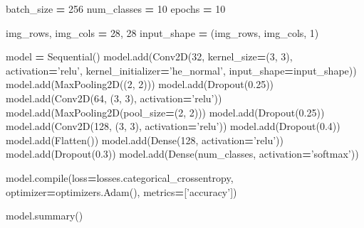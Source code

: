\documentclass[]{book}
\newenvironment{Shaded}{\begin{snugshade}}{\end{snugshade}}
\newcommand{\DecValTok}[1]{\textcolor[rgb]{0.00,0.00,0.81}{#1}}
\newcommand{\FloatTok}[1]{\textcolor[rgb]{0.00,0.00,0.81}{#1}}
\newcommand{\StringTok}[1]{\textcolor[rgb]{0.31,0.60,0.02}{#1}}
\newcommand{\OperatorTok}[1]{\textcolor[rgb]{0.81,0.36,0.00}{\textbf{#1}}}
\newcommand{\BuiltInTok}[1]{#1}
\newcommand{\NormalTok}[1]{#1}
\theoremstyle{definition}
\theoremstyle{definition}
\theoremstyle{definition}
\theoremstyle{remark}
\begin{document}
\begin{Shaded}
\begin{Highlighting}[]
\NormalTok{batch_size }\OperatorTok{=} \DecValTok{256}
\NormalTok{num_classes }\OperatorTok{=} \DecValTok{10}
\NormalTok{epochs }\OperatorTok{=} \DecValTok{10}

\NormalTok{img_rows, img_cols }\OperatorTok{=} \DecValTok{28}\NormalTok{, }\DecValTok{28}
\NormalTok{input_shape }\OperatorTok{=}\NormalTok{ (img_rows, img_cols, }\DecValTok{1}\NormalTok{)}

\NormalTok{model }\OperatorTok{=}\NormalTok{ Sequential()}
\NormalTok{model.add(Conv2D(}\DecValTok{32}\NormalTok{, kernel_size}\OperatorTok{=}\NormalTok{(}\DecValTok{3}\NormalTok{, }\DecValTok{3}\NormalTok{),}
\NormalTok{                 activation}\OperatorTok{=}\StringTok{'relu'}\NormalTok{,}
\NormalTok{                 kernel_initializer}\OperatorTok{=}\StringTok{'he_normal'}\NormalTok{,}
\NormalTok{                 input_shape}\OperatorTok{=}\NormalTok{input_shape))}
\NormalTok{model.add(MaxPooling2D((}\DecValTok{2}\NormalTok{, }\DecValTok{2}\NormalTok{)))}
\NormalTok{model.add(Dropout(}\FloatTok{0.25}\NormalTok{))}
\NormalTok{model.add(Conv2D(}\DecValTok{64}\NormalTok{, (}\DecValTok{3}\NormalTok{, }\DecValTok{3}\NormalTok{), activation}\OperatorTok{=}\StringTok{'relu'}\NormalTok{))}
\NormalTok{model.add(MaxPooling2D(pool_size}\OperatorTok{=}\NormalTok{(}\DecValTok{2}\NormalTok{, }\DecValTok{2}\NormalTok{)))}
\NormalTok{model.add(Dropout(}\FloatTok{0.25}\NormalTok{))}
\NormalTok{model.add(Conv2D(}\DecValTok{128}\NormalTok{, (}\DecValTok{3}\NormalTok{, }\DecValTok{3}\NormalTok{), activation}\OperatorTok{=}\StringTok{'relu'}\NormalTok{))}
\NormalTok{model.add(Dropout(}\FloatTok{0.4}\NormalTok{))}
\NormalTok{model.add(Flatten())}
\NormalTok{model.add(Dense(}\DecValTok{128}\NormalTok{, activation}\OperatorTok{=}\StringTok{'relu'}\NormalTok{))}
\NormalTok{model.add(Dropout(}\FloatTok{0.3}\NormalTok{))}
\NormalTok{model.add(Dense(num_classes, activation}\OperatorTok{=}\StringTok{'softmax'}\NormalTok{))}

\NormalTok{model.}\BuiltInTok{compile}\NormalTok{(loss}\OperatorTok{=}\NormalTok{losses.categorical_crossentropy,}
\NormalTok{              optimizer}\OperatorTok{=}\NormalTok{optimizers.Adam(),}
\NormalTok{              metrics}\OperatorTok{=}\NormalTok{[}\StringTok{'accuracy'}\NormalTok{])}

\NormalTok{model.summary()}
\end{Highlighting}
\end{Shaded}
\end{document}
